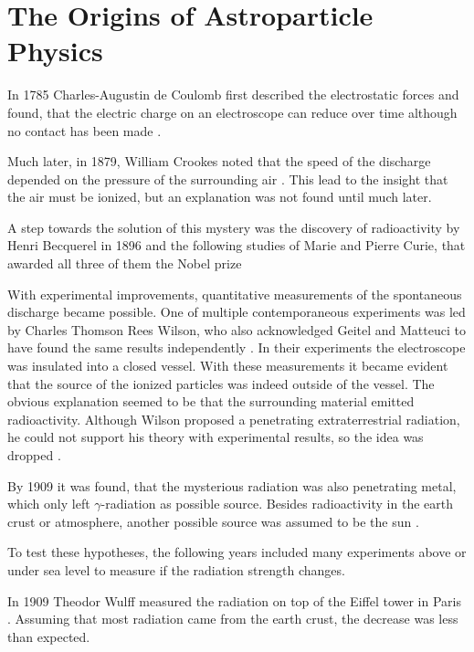 \section{The Origins of Astroparticle Physics}
In 1785 Charles-Augustin de Coulomb first described the electrostatic forces 
and found, that the electric charge on an electroscope can
reduce over time although no contact has been made \cite{Stewart2017PB-PrincetonUniversityPressCY-Princeton}.

Much later, in 1879, William Crookes noted that the speed of the discharge
depended on the pressure of the surrounding air 
\cite{doi:10.1098/rstl.1879.0076}.
This lead to the insight that the air must be ionized, but an 
explanation was not found until much later.

A step towards the solution of this mystery was the discovery 
of radioactivity by Henri Becquerel in 1896 
\cite{becquerel1903radioactivity}
and the following studies of Marie and Pierre Curie, 
that awarded all three of them the Nobel prize \cite{nobel_curie}

With experimental improvements, quantitative measurements
of the spontaneous discharge became possible.
One of multiple contemporaneous experiments was 
led by Charles Thomson Rees Wilson, who also 
acknowledged Geitel and Matteuci to have found the same 
results independently
\cite{doi:10.1098/rspl.1901.0032}.
In their experiments the electroscope was insulated into a closed vessel.
With these measurements it became evident that the source 
of the ionized particles was indeed outside of the vessel.
The obvious explanation seemed to be that the surrounding material 
emitted radioactivity.
Although Wilson proposed a penetrating extraterrestrial radiation, 
he could not support his theory with experimental results, 
so the idea was dropped \cite{bookap}.

By 1909 it was found, that the mysterious radiation was also 
penetrating metal, which only left $\gamma$-radiation as 
possible source. Besides radioactivity in the earth crust or atmosphere,
another possible source was assumed to be the sun \cite{bookap}.

To test these hypotheses, the following years included many experiments 
above or under sea level to measure if the radiation strength changes.

In 1909 Theodor Wulff measured the radiation on top of the 
Eiffel tower in Paris
\cite{horandel2013early}.
Assuming that most radiation came from the 
earth crust, the decrease was less than expected.

